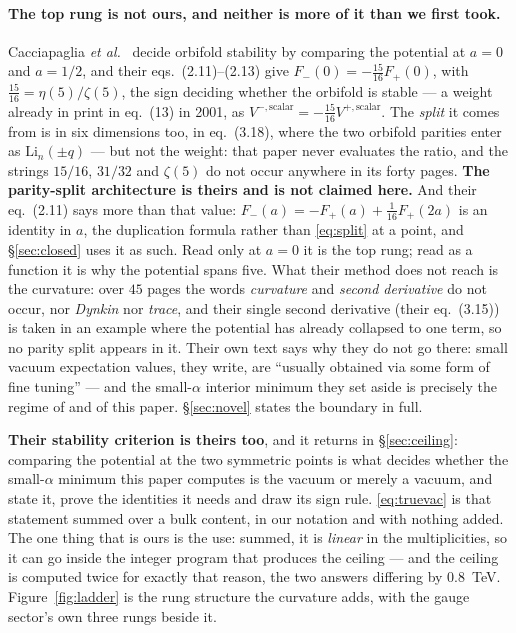 \documentclass[11pt,a4paper]{article}
\begin{document}
\paragraph{The top rung is not ours, and neither is more of it than we first took.} Cacciapaglia
\emph{et al.}~\cite{CCD24} decide orbifold stability by comparing the potential at $a=0$ and
$a=1/2$, and their eqs.~(2.11)--(2.13) give $F_-(0)=-\tfrac{15}{16}F_+(0)$, with
$\tfrac{15}{16}=\eta(5)/\zeta(5)$, the sign deciding whether the orbifold is stable --- a weight
already in print in \cite{PP01} eq.~(13) in 2001, as
$V^{-,\text{scalar}}=-\tfrac{15}{16}V^{+,\text{scalar}}$. The \emph{split} it comes from is in six
dimensions too, in \cite{GHBQ05} eq.~(3.18), where the two orbifold parities enter as
$\mathrm{Li}_n(\pm q)$ --- but not the weight: that paper never evaluates the ratio, and the
strings $15/16$, $31/32$ and $\zeta(5)$ do not occur anywhere in its forty pages.
\textbf{The parity-split architecture is theirs and is not claimed here.} And their eq.~(2.11) says
more than that value: $F_-(a)=-F_+(a)+\tfrac1{16}F_+(2a)$ is an identity in $a$, the duplication
formula \cite{Wood} rather than \eqref{eq:split} at a point, and \S\ref{sec:closed} uses it as such.
Read only at $a=0$ it is the top rung; read as a function it is why the potential spans five. What their method does not reach is the curvature: over $45$ pages
the words \emph{curvature} and \emph{second derivative} do not occur, nor \emph{Dynkin} nor
\emph{trace}, and their single second derivative (their eq.~(3.15)) is taken in an example where the
potential has already collapsed to one term, so no parity split appears in it. Their own text says
why they do not go there: small vacuum expectation values, they write, are ``usually obtained via
some form of fine tuning'' --- and the small-$\alpha$ interior minimum they set aside is precisely
the regime of \cite{KM25} and of this paper. \S\ref{sec:novel} states the boundary in full.

\textbf{Their stability criterion is theirs too}, and it returns in \S\ref{sec:ceiling}: comparing
the potential at the two symmetric points is what decides whether the small-$\alpha$ minimum this
paper computes is the vacuum or merely a vacuum, and \cite{CCD24} state it, prove the identities it
needs and draw its sign rule. \eqref{eq:truevac} is that statement summed over a bulk content, in
our notation and with nothing added. The one thing that is ours is the use: summed, it is
\emph{linear} in the multiplicities, so it can go inside the integer program that produces the
ceiling --- and the ceiling is computed twice for exactly that reason, the two answers differing by
$0.8$~TeV.
Figure~\ref{fig:ladder} is the rung structure the curvature adds, with the gauge sector's own three
rungs beside it.
\end{document}
